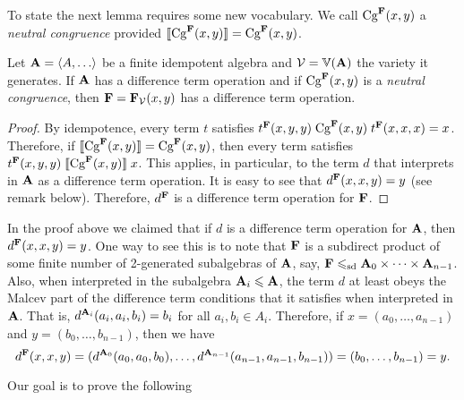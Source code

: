 To state the next lemma requires some new vocabulary.
We call $\operatorname{Cg}^{\mathbf{F}}(x,y)$ a \emph{neutral congruence}
provided $\llbracket \operatorname{Cg}^{\mathbf{F}}(x,y) \rrbracket = \operatorname{Cg}^{\mathbf{F}}(x,y)$.  

\begin{lemma}
\label{lem:cong-neut}  
Let $\bA = \<A, \dots\>$ be a finite idempotent algebra and $\mathcal{V} = \operatorname{\mathbb{V}}(\mathbf{A})$ the
variety it generates.  If $\mathbf{A}$ has a difference term operation
and if $\operatorname{Cg}^{\mathbf{F}}(x,y)$ is a \emph{neutral congruence}, then
$\mathbf{F} = \mathbf{F}_{\mathcal{V}}(x,y)$ has a difference term operation.
\end{lemma}
\begin{proof}
  By idempotence, every term
  $t$ satisfies $t^{\mathbf{F}}(x,y,y) \mathrel{\operatorname{Cg}^{\mathbf{F}}(x,y)} t^{\mathbf{F}}(x,x,x) = x$.
  Therefore, if $\llbracket \operatorname{Cg}^{\mathbf{F}}(x,y) \rrbracket = \operatorname{Cg}^{\mathbf{F}}(x,y)$, then every term
  satisfies $t^{\mathbf{F}}(x,y,y) \mathrel{\llbracket \operatorname{Cg}^{\mathbf{F}}(x,y) \rrbracket} x$.
  This applies, in particular, to the term $d$ that interprets in $\mathbf{A}$ as a
  difference term operation.
  It is easy to see that
  $d^{\mathbf{F}}(x,x,y) = y$ (see remark below). Therefore,
  $d^{\mathbf{F}}$ is a difference term operation for $\mathbf{F}$.
\end{proof}
\begin{remark}
  In the proof above we claimed that if $d$ is a difference term operation for $\mathbf{A}$,
  then $d^{\mathbf{F}}(x,x,y) = y$.  One way to see this is to note that $\mathbf{F}$ is a
  subdirect product of some finite number of 2-generated subalgebras of $\mathbf{A}$,
  say, $\mathbf{F} \leqslant_{\mathrm{sd}} \mathbf{A}_0 \times \cdots \times \mathbf{A}_{n-1}$. Also, when interpreted
  in the subalgebra $\mathbf{A}_i \leqslant \mathbf{A}$, the term $d$ at least obeys
  the Malcev part of the difference term conditions that it satisfies when
  interpreted in $\mathbf{A}$.
  That is,   $d^{\mathbf{A}_i}(a_i, a_i, b_i) = b_i$ for all $a_i, b_i \in A_i$.
  Therefore, if $x = (a_0, \dots, a_{n-1})$
  and $y = (b_0, \dots, b_{n-1})$, then we have
  \[
  d^{\mathbf{F}}(x,x,y) = 
  (d^{\mathbf{A}_0}(a_0, a_0, b_0), \dots,d^{\mathbf{A}_{n-1}}(a_{n-1}, a_{n-1}, b_{n-1}))
  = (b_0, \dots, b_{n-1}) = y.\]
\end{remark}

Our goal is to prove the following

